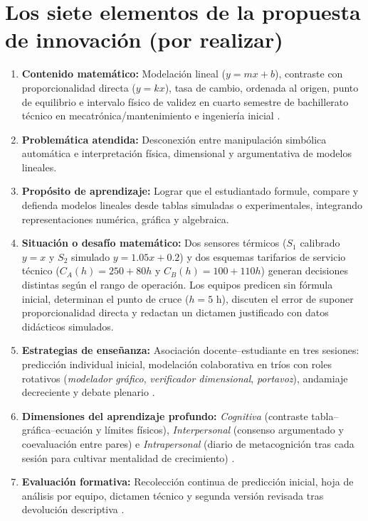 \documentclass[spanish,letterpaper,oneside]{article}
\begin{document}
\section{Los siete elementos de la propuesta de innovación (por realizar)}
\begin{tcolorbox}[colback=iiiepePale,colframe=iiiepeNavy,title=\textbf{Ficha técnica integral · «Calibrar y comparar para decidir» (por realizar)},breakable]
\begin{enumerate}
  \item \textbf{Contenido matemático:} Modelación lineal ($y = mx + b$), contraste con proporcionalidad directa ($y = kx$), tasa de cambio, ordenada al origen, punto de equilibrio e intervalo físico de validez en cuarto semestre de bachillerato técnico en mecatrónica/mantenimiento e ingeniería inicial \citep{sep2023pensamiento,conalep2025mecatronica}.
  \item \textbf{Problemática atendida:} Desconexión entre manipulación simbólica automática e interpretación física, dimensional y argumentativa de modelos lineales.
  \item \textbf{Propósito de aprendizaje:} Lograr que el estudiantado formule, compare y defienda modelos lineales desde tablas simuladas o experimentales, integrando representaciones numérica, gráfica y algebraica.
  \item \textbf{Situación o desafío matemático:} Dos sensores térmicos ($S_1$ calibrado $y=x$ y $S_2$ simulado $y=1.05x+0.2$) y dos esquemas tarifarios de servicio técnico ($C_A(h)=250+80h$ y $C_B(h)=100+110h$) generan decisiones distintas según el rango de operación. Los equipos predicen sin fórmula inicial, determinan el punto de cruce ($h=5\text{ h}$), discuten el error de suponer proporcionalidad directa y redactan un dictamen justificado con datos didácticos simulados.
  \item \textbf{Estrategias de enseñanza:} Asociación docente--estudiante en tres sesiones: predicción individual inicial, modelación colaborativa en tríos con roles rotativos (\textit{modelador gráfico}, \textit{verificador dimensional}, \textit{portavoz}), andamiaje decreciente y debate plenario \citep{fullan2014rich,sawyer2008optimizing}.
  \item \textbf{Dimensiones del aprendizaje profundo:} \textit{Cognitiva} (contraste tabla--gráfica--ecuación y límites físicos), \textit{Interpersonal} (consenso argumentado y coevaluación entre pares) e \textit{Intrapersonal} (diario de metacognición tras cada sesión para cultivar mentalidad de crecimiento) \citep{schunk2012teorias}.
  \item \textbf{Evaluación formativa:} Recolección continua de predicción inicial, hoja de análisis por equipo, dictamen técnico y segunda versión revisada tras devolución descriptiva \citep{bostrom2023formative,eef2021feedback}.
\end{enumerate}
\end{tcolorbox}
\end{document}
